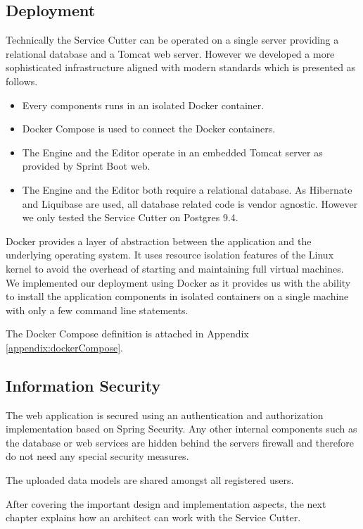 \subsection{Deployment}
\label{subsec:infrastructure}

Technically the Service Cutter can be operated on a single server providing a relational database and a Tomcat web server. However we developed a more sophisticated infrastructure aligned with modern standards which is presented as follows.

\begin{itemize}
\item Every components runs in an isolated Docker\cite{docker} container.
\item Docker Compose\cite{dockercompose} is used to connect the Docker containers.
\item The Engine and the Editor operate in an embedded Tomcat\cite{tomcat} server as provided by Sprint Boot web.
\item The Engine and the Editor both require a relational database. As Hibernate\cite{hibernate} and Liquibase\cite{liquibase} are used, all database related code is vendor agnostic. However we only tested the Service Cutter on Postgres 9.4\cite{postgres}.
\end{itemize}

Docker provides a layer of abstraction between the application and the underlying operating system. It uses resource isolation features of the Linux kernel to avoid the overhead of starting and maintaining full virtual machines. We implemented our deployment using Docker as it provides us with the ability to install the application components in isolated containers on a single machine with only a few command line statements.

The Docker Compose definition is attached in Appendix \ref{appendix:dockerCompose}.


\subsection{Information Security}

The web application is secured using an authentication and authorization implementation based on Spring Security\cite{springSecurity}. Any other internal components such as the database or web services are hidden behind the servers firewall and therefore do not need any special security measures.

The uploaded data models are shared amongst all registered users.


\bigskip
After covering the important design and implementation aspects, the next chapter explains how an architect can work with the Service Cutter.
